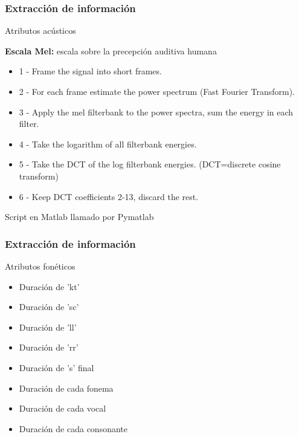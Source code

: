 \documentclass[mathserif]{beamer}%
\begin{document}
\begin{frame}
	\frametitle{Extracción de información}
	\Large {Atributos acústicos}
	
	{\normalsize \textbf{Escala Mel:} escala sobre la precepción auditiva humana
	
	\begin{itemize}
		\item 1 - Frame the signal into short frames.
		\item 2 - For each frame estimate the power spectrum (Fast Fourier Transform).
		\item 3 - Apply the mel filterbank to the power spectra, sum the energy in each filter.
		\item 4 - Take the logarithm of all filterbank energies.
		\item 5 - Take the DCT of the log filterbank energies. (DCT=discrete cosine transform)
		\item 6 - Keep DCT coefficients 2-13, discard the rest.
	\end{itemize}
	
	Script en Matlab llamado por Pymatlab
	
	}
\end{frame}

\begin{frame}
	\frametitle{Extracción de información}
	\Large {Atributos fonéticos}
	
	\begin{itemize}
		\item Duración de 'kt'
		\item Duración de 'sc'
		\item Duración de 'll'
		\item Duración de 'rr'
		\item Duración de 's' final
		\item Duración de cada fonema
		\item Duración de cada vocal 
		\item Duración de cada consonante
	\end{itemize}
\end{frame}
\end{document}
